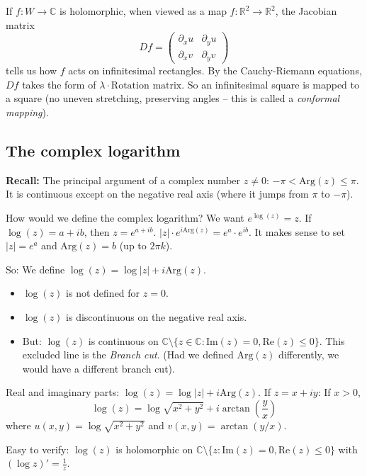 If $f: W \rightarrow \mathbb{C}$ is holomorphic, when viewed as a map $f: \mathbb{R}^{2} \rightarrow \mathbb{R}^{2}$, the Jacobian matrix
$$ Df = \begin{pmatrix} \partial_{x}u & \partial_{y}u \\ \partial_{x}v & \partial_{y}v \end{pmatrix} $$
tells us how $f$ acts on infinitesimal rectangles.
By the Cauchy-Riemann equations, $Df$ takes the form of $\lambda \cdot \text{Rotation matrix}$.
So an infinitesimal square is mapped to a square (no uneven stretching, preserving angles -- this is called a \textit{conformal mapping}).

\subsection{The complex logarithm}

\begin{definition}
\textbf{Recall:} The principal argument of a complex number $z \neq 0$: $-\pi < \text{Arg}(z) \leq \pi$.
It is continuous except on the negative real axis (where it jumps from $\pi$ to $-\pi$).

How would we define the complex logarithm? We want $e^{\log(z)} = z$.
If $\log(z) = a + ib$, then $z = e^{a+ib}$.
$|z| \cdot e^{i\text{Arg}(z)} = e^{a} \cdot e^{ib}$.
It makes sense to set $|z| = e^{a}$ and $\text{Arg}(z) = b$ (up to $2\pi k$).

So: We define $\log(z) = \log|z| + i\text{Arg}(z)$.
\begin{itemize}
    \item $\log(z)$ is not defined for $z=0$.
    \item $\log(z)$ is discontinuous on the negative real axis.
    \item But: $\log(z)$ is continuous on $\mathbb{C} \setminus \{z \in \mathbb{C} : \text{Im}(z) = 0, \text{Re}(z) \leq 0\}$. This excluded line is the \textit{Branch cut}. (Had we defined $\text{Arg}(z)$ differently, we would have a different branch cut).
\end{itemize}
\end{definition}

Real and imaginary parts: $\log(z) = \log|z| + i\text{Arg}(z)$.
If $z = x+iy$: If $x > 0$,
$$ \log(z) = \log\sqrt{x^{2}+y^{2}} + i\arctan\left(\frac{y}{x}\right) $$
where $u(x,y) = \log\sqrt{x^2+y^2}$ and $v(x,y) = \arctan(y/x)$.

Easy to verify: $\log(z)$ is holomorphic on $\mathbb{C} \setminus \{z : \text{Im}(z) = 0, \text{Re}(z) \leq 0\}$ with $(\log z)' = \frac{1}{z}$.

